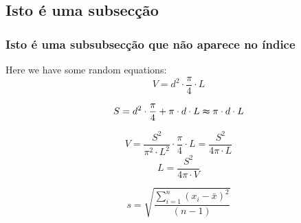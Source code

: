 \subsection{Isto é uma subsecção}
\subsubsection{Isto é uma subsubsecção que não aparece no índice}\label{subsub}
Here we have some random equations: 
\begin{equation}\label{Volume}
V = d^2\cdot \frac{\pi}{4}\cdot L
\end{equation}

\begin{equation}\label{Surface}
S = d^2 \cdot \frac{\pi}{4} + \pi \cdot d \cdot L \thickapprox \pi \cdot d \cdot L
\end{equation}

\begin{equation}\label{Volume1}
V = \frac{S^2}{\pi ^2 \cdot L^2} \cdot \frac{\pi}{4}\cdot L = \frac{S^2}{4\pi \cdot L}
\end{equation}
\begin{equation}\label{Length}
L = \frac{S^2}{4\pi \cdot V}
\end{equation}

\begin{equation}\label{stdv}
 s = \sqrt{\frac{\sum_{i=1}^n (x_i-\bar{x})^2}{(n-1)}}
\end{equation}

\newpage

